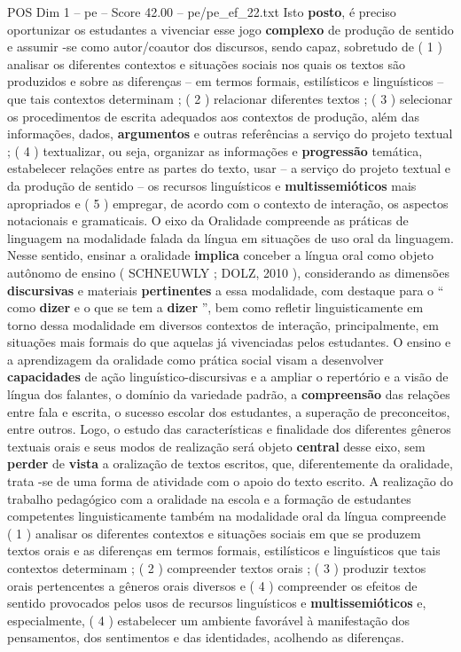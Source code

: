 \begin{textsample}{POS Dim 1 – pe – Score 42.00 – pe/pe\_ef\_22.txt}
Isto \textbf{posto}, é preciso oportunizar os estudantes a vivenciar esse jogo \textbf{complexo} de produção de sentido e assumir -se como autor/coautor dos discursos, sendo capaz, sobretudo de ( 1 ) analisar os diferentes contextos e situações sociais nos quais os textos são produzidos e sobre as diferenças – em termos formais, estilísticos e linguísticos – que tais contextos determinam ; ( 2 ) relacionar diferentes textos ; ( 3 ) selecionar os procedimentos de escrita adequados aos contextos de produção, além das informações, dados, \textbf{argumentos} e outras referências a serviço do projeto textual ; ( 4 ) textualizar, ou seja, organizar as informações e \textbf{progressão} temática, estabelecer relações entre as partes do texto, usar – a serviço do projeto textual e da produção de sentido – os recursos linguísticos e \textbf{multissemióticos} mais apropriados e ( 5 ) empregar, de acordo com o contexto de interação, os aspectos notacionais e gramaticais.
O eixo da Oralidade compreende as práticas de linguagem na modalidade falada da língua em situações de uso oral da linguagem.
Nesse sentido, ensinar a oralidade \textbf{implica} conceber a língua oral como objeto autônomo de ensino ( SCHNEUWLY ; DOLZ, 2010 ), considerando as dimensões \textbf{discursivas} e materiais \textbf{pertinentes} a essa modalidade, com destaque para o “ como \textbf{dizer} e o que se tem a \textbf{dizer} ”, bem como refletir linguisticamente em torno dessa modalidade em diversos contextos de interação, principalmente, em situações mais formais do que aquelas já vivenciadas pelos estudantes.
O ensino e a aprendizagem da oralidade como prática social visam a desenvolver \textbf{capacidades} de ação linguístico-discursivas e a ampliar o repertório e a visão de língua dos falantes, o domínio da variedade padrão, a \textbf{compreensão} das relações entre fala e escrita, o sucesso escolar dos estudantes, a superação de preconceitos, entre outros.
Logo, o estudo das características e finalidade dos diferentes gêneros textuais orais e seus modos de realização será objeto \textbf{central} desse eixo, sem \textbf{perder} de \textbf{vista} a oralização de textos escritos, que, diferentemente da oralidade, trata -se de uma forma de atividade com o apoio do texto escrito.
A realização do trabalho pedagógico com a oralidade na escola e a formação de estudantes competentes linguisticamente também na modalidade oral da língua compreende ( 1 ) analisar os diferentes contextos e situações sociais em que se produzem textos orais e as diferenças em termos formais, estilísticos e linguísticos que tais contextos determinam ; ( 2 ) compreender textos orais ; ( 3 ) produzir textos orais pertencentes a gêneros orais diversos e ( 4 ) compreender os efeitos de sentido provocados pelos usos de recursos linguísticos e \textbf{multissemióticos} e, especialmente, ( 4 ) estabelecer um ambiente favorável à manifestação dos pensamentos, dos sentimentos e das identidades, acolhendo as diferenças.

\end{textsample}
